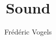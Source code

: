 \usepackage{ucll-code}
\usepackage{nicefrac}
\usepackage{siunitx}
\usetikzlibrary{shadows,shapes.multipart}


\title{Sound}
\author{Fr\'ed\'eric Vogels}

\newcommand{\csharp}{C$^\sharp$}



\begin{frame}
  \titlepage
\end{frame}

% 






